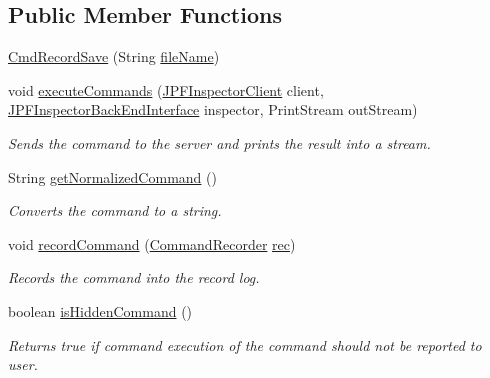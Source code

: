 \subsection*{Public Member Functions}
\begin{DoxyCompactItemize}
\item 
\hyperlink{classgov_1_1nasa_1_1jpf_1_1inspector_1_1client_1_1commands_1_1_cmd_record_save_a10c97e0e1c13306cd366d7aa1a09236d}{Cmd\+Record\+Save} (String \hyperlink{classgov_1_1nasa_1_1jpf_1_1inspector_1_1client_1_1commands_1_1_cmd_record_save_a7dbe446c5de22c4c43ae96f83044ac03}{file\+Name})
\item 
void \hyperlink{classgov_1_1nasa_1_1jpf_1_1inspector_1_1client_1_1commands_1_1_cmd_record_save_a097b0a5e7e352692840ccad489f72417}{execute\+Commands} (\hyperlink{classgov_1_1nasa_1_1jpf_1_1inspector_1_1client_1_1_j_p_f_inspector_client}{J\+P\+F\+Inspector\+Client} client, \hyperlink{interfacegov_1_1nasa_1_1jpf_1_1inspector_1_1interfaces_1_1_j_p_f_inspector_back_end_interface}{J\+P\+F\+Inspector\+Back\+End\+Interface} inspector, Print\+Stream out\+Stream)
\begin{DoxyCompactList}\small\item\em Sends the command to the server and prints the result into a stream. \end{DoxyCompactList}\item 
String \hyperlink{classgov_1_1nasa_1_1jpf_1_1inspector_1_1client_1_1commands_1_1_cmd_record_save_afcaba982f5ef984c6782233a45a8cd71}{get\+Normalized\+Command} ()
\begin{DoxyCompactList}\small\item\em Converts the command to a string. \end{DoxyCompactList}\item 
void \hyperlink{classgov_1_1nasa_1_1jpf_1_1inspector_1_1client_1_1commands_1_1_cmd_record_save_a1fac27411cf1bdd7e8ae5e792fc67441}{record\+Command} (\hyperlink{classgov_1_1nasa_1_1jpf_1_1inspector_1_1client_1_1_command_recorder}{Command\+Recorder} \hyperlink{classgov_1_1nasa_1_1jpf_1_1inspector_1_1client_1_1_client_command_af4246f2427035c72a6af45a2c61361f7}{rec})
\begin{DoxyCompactList}\small\item\em Records the command into the record log. \end{DoxyCompactList}\item 
boolean \hyperlink{classgov_1_1nasa_1_1jpf_1_1inspector_1_1client_1_1_client_command_afb09c400c64e2d8e01059b91ff847761}{is\+Hidden\+Command} ()
\begin{DoxyCompactList}\small\item\em Returns true if command execution of the command should not be reported to user. \end{DoxyCompactList}\end{DoxyCompactItemize}
